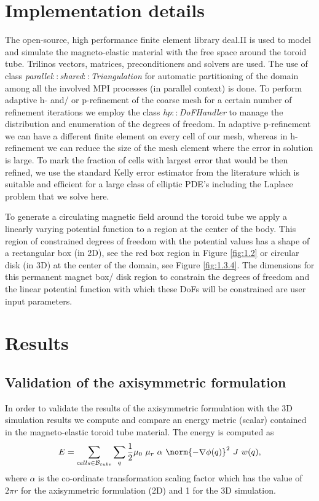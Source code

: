 \section{Implementation details}
The open-source, high performance finite element library deal.II \cite{BangerthHartmannKanschat2007,dealII90} is used to model and simulate the magneto-elastic material with the free space around the toroid tube. Trilinos \cite{trilinos} vectors, matrices, preconditioners and solvers are used. The use of class  \emph{parallel$::$shared$::$Triangulation} for automatic partitioning of the domain among all the involved MPI processes (in parallel context) is done. To perform adaptive h- and/ or p-refinement of the coarse mesh for a certain number of refinement iterations we employ the class \emph{hp$::$DoFHandler} to manage the distribution and enumeration of the degrees of freedom. In adaptive p-refinement we can have a different finite element on every cell of our mesh, whereas in h-refinement we can reduce the size of the mesh element where the error in solution is large. To mark the fraction of cells with largest error that would be then refined, we use the standard Kelly error estimator from the literature which is suitable and efficient for a large class of elliptic PDE's including the Laplace problem that we solve here. \par 
To generate a circulating magnetic field around the toroid tube we apply a linearly varying potential function to a region at the center of the body. This region of constrained degrees of freedom with the potential values has a shape of a rectangular box (in 2D), see the red box region in Figure \eqref{fig:1.2} or circular disk (in 3D) at the center of the domain, see Figure \eqref{fig:1.3.4}. The dimensions for this permanent magnet box/ disk region to constrain the degrees of freedom and the linear potential function with which these DoFs will be constrained are user input parameters. \par 

\section{Results}
\subsection{Validation of the axisymmetric formulation}
In order to validate the results of the axisymmetric formulation with the 3D simulation results we compute and compare an energy metric (scalar) contained in the magneto-elastic toroid tube material. The energy is computed as
\begin{equation}
E = \sum\limits_{cells \in \mathcal{B}_{tube}} \sum\limits_{q} \frac{1}{2} \mu_0 \ \mu_r \ \alpha \ \norm{-\nabla \phi(q)}^2 \ J \ w(q),
\end{equation}
where $\alpha$ is the co-ordinate transformation scaling factor which has the value of $2 \pi r$ for the axisymmetric formulation (2D) and 1 for the 3D simulation.\par 

